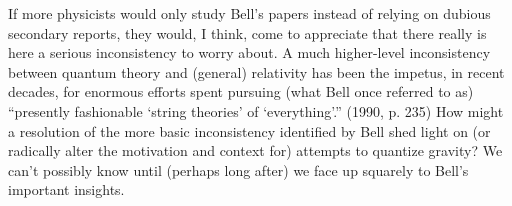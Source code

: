 \documentclass[12pt]{article}
\begin{document}
If more physicists would only study Bell's papers instead of relying 
on dubious secondary reports, they would, I think, come to appreciate
that there really is here a serious inconsistency to worry about.  A
much higher-level inconsistency between quantum theory 
and (general) relativity
has been the impetus, in recent decades, for enormous efforts spent
pursuing (what Bell once referred to as) ``presently fashionable
`string theories' of `everything'.''  (1990, p. 235)  How might
a resolution of the more basic inconsistency identified by Bell shed
light on (or radically alter the motivation and context for) attempts 
to quantize gravity?  We can't possibly know until (perhaps long
after) we face up squarely to Bell's important insights.
\end{document}
